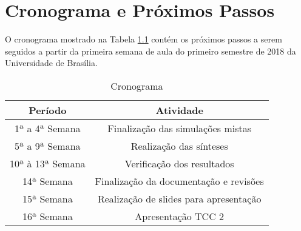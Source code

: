 \chapter{Cronograma e Próximos Passos}
O cronograma mostrado na Tabela \ref{tab2} contém os próximos passos a serem seguidos a partir da primeira semana de aula do primeiro semestre de 2018 da Universidade de Brasília.

\begin{table}[h!]
\centering
\begin{tabular}{|c|c|}

\hline
\textbf{Período} & \textbf{Atividade}\\
\hline
1ª a 4ª Semana & Finalização das simulações mistas\\
\hline
5ª a 9ª Semana & Realização das sínteses\\
\hline
10ª à 13ª Semana & Verificação dos resultados\\
\hline
14ª Semana & Finalização da documentação e revisões\\ 
\hline
15ª Semana & Realização de slides para apresentação\\
\hline
16ª Semana & Apresentação TCC 2\\
\hline
\end{tabular}
\caption{Cronograma}
\label{tab2}
\end{table}


